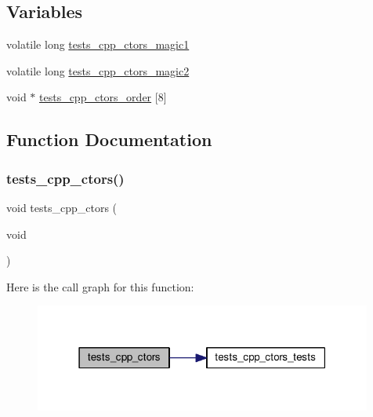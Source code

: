 \subsection*{Variables}
\begin{DoxyCompactItemize}
\item 
volatile long \hyperlink{tests-cpp__ctors-trampoline_8c_a5619bbc2d07e49c6a1b1a3fe75bb3977}{tests\+\_\+cpp\+\_\+ctors\+\_\+magic1}
\item 
volatile long \hyperlink{tests-cpp__ctors-trampoline_8c_a5d0a3a17669d50bc13f993a880e309f5}{tests\+\_\+cpp\+\_\+ctors\+\_\+magic2}
\item 
void $\ast$ \hyperlink{tests-cpp__ctors-trampoline_8c_a97fee776631a57a7cbe25a6508dc17dd}{tests\+\_\+cpp\+\_\+ctors\+\_\+order} \mbox{[}8\mbox{]}
\end{DoxyCompactItemize}


\subsection{Function Documentation}
\mbox{\label{tests-cpp__ctors-trampoline_8c_a36528c92944d8c70691edea0e08ac2af}} 
\subsubsection{\texorpdfstring{tests\+\_\+cpp\+\_\+ctors()}{tests\_cpp\_ctors()}}
{\footnotesize\ttfamily void tests\+\_\+cpp\+\_\+ctors (\begin{DoxyParamCaption}\item[{void}]{ }\end{DoxyParamCaption})}

Here is the call graph for this function\+:
\nopagebreak
\begin{figure}[H]
\begin{center}
\leavevmode
\includegraphics[width=315pt]{tests-cpp__ctors-trampoline_8c_a36528c92944d8c70691edea0e08ac2af_cgraph}
\end{center}
\end{figure}
\mbox{\label{tests-cpp__ctors-trampoline_8c_abe68002aa60f5430c49e9a60c833204a}} 
